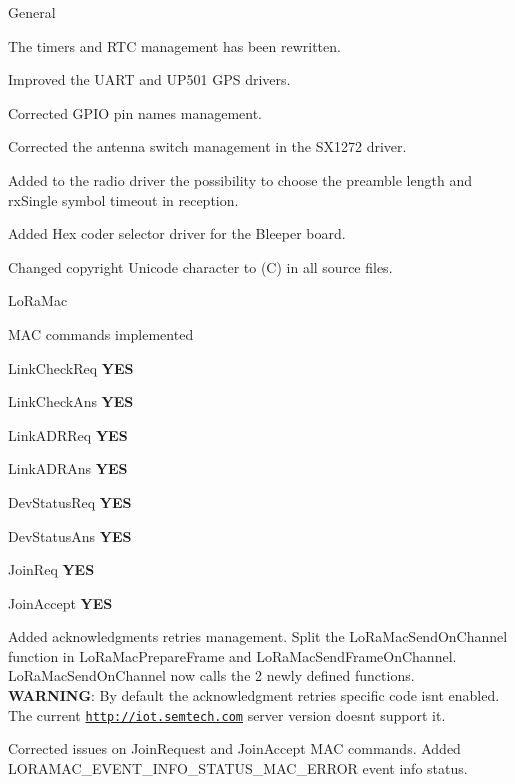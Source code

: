 \begin{DoxyItemize}
\item General
\begin{DoxyEnumerate}
\item The timers and R\+TC management has been rewritten.
\item Improved the U\+A\+RT and U\+P501 G\+PS drivers.
\item Corrected G\+P\+IO pin names management.
\item Corrected the antenna switch management in the S\+X1272 driver.
\item Added to the radio driver the possibility to choose the preamble length and rx\+Single symbol timeout in reception.
\item Added Hex coder selector driver for the Bleeper board.
\item Changed copyright Unicode character to (C) in all source files.
\end{DoxyEnumerate}
\item Lo\+Ra\+Mac
\begin{DoxyEnumerate}
\item M\+AC commands implemented
\begin{DoxyItemize}
\item Link\+Check\+Req {\bfseries Y\+ES}
\item Link\+Check\+Ans {\bfseries Y\+ES}
\item Link\+A\+D\+R\+Req {\bfseries Y\+ES}
\item Link\+A\+D\+R\+Ans {\bfseries Y\+ES}
\item Dev\+Status\+Req {\bfseries Y\+ES}
\item Dev\+Status\+Ans {\bfseries Y\+ES}
\item Join\+Req {\bfseries Y\+ES}
\item Join\+Accept {\bfseries Y\+ES}
\end{DoxyItemize}
\item Added acknowledgments retries management. Split the Lo\+Ra\+Mac\+Send\+On\+Channel function in Lo\+Ra\+Mac\+Prepare\+Frame and Lo\+Ra\+Mac\+Send\+Frame\+On\+Channel. Lo\+Ra\+Mac\+Send\+On\+Channel now calls the 2 newly defined functions. ~\newline
 {\bfseries W\+A\+R\+N\+I\+NG}\+: By default the acknowledgment retries specific code isn\textquotesingle{}t enabled. The current \href{http://iot.semtech.com}{\tt http\+://iot.\+semtech.\+com} server version doesn\textquotesingle{}t support it.
\item Corrected issues on Join\+Request and Join\+Accept M\+AC commands. Added L\+O\+R\+A\+M\+A\+C\+\_\+\+E\+V\+E\+N\+T\+\_\+\+I\+N\+F\+O\+\_\+\+S\+T\+A\+T\+U\+S\+\_\+\+M\+A\+C\+\_\+\+E\+R\+R\+OR event info status.
\end{DoxyEnumerate}
\end{DoxyItemize}

